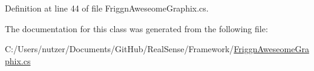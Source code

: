Definition at line 44 of file Friggn\+Aweseome\+Graphix.\+cs.



The documentation for this class was generated from the following file\+:\begin{DoxyCompactItemize}
\item 
C\+:/\+Users/nutzer/\+Documents/\+Git\+Hub/\+Real\+Sense/\+Framework/\hyperlink{_friggn_aweseome_graphix_8cs}{Friggn\+Aweseome\+Graphix.\+cs}\end{DoxyCompactItemize}

